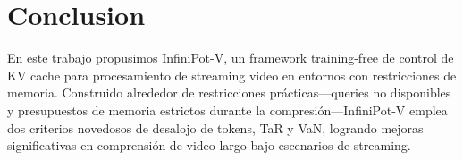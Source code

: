 \section{Conclusion}\label{sec:conclustion}

En este trabajo propusimos InfiniPot-V, un framework training-free de control de KV cache para procesamiento de streaming video en entornos con restricciones de memoria.
Construido alrededor de restricciones prácticas—queries no disponibles y presupuestos de memoria estrictos durante la compresión—InfiniPot-V emplea dos criterios novedosos de desalojo de tokens, TaR y VaN, logrando mejoras significativas en comprensión de video largo bajo escenarios de streaming.
